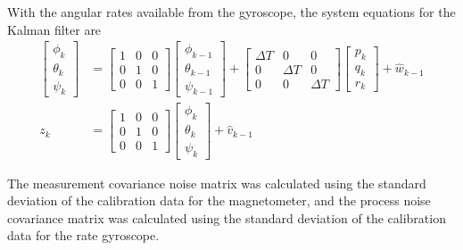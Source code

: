 With the angular rates available from the gyroscope, the system equations for the Kalman filter are
\begin{align}
\begin{bmatrix}
\phi_{k}\\
\theta_{k}\\
\psi_{k}
\end{bmatrix} & = \begin{bmatrix}
1 & 0 & 0\\0 & 1 & 0\\0 & 0 & 1
\end{bmatrix}\begin{bmatrix}
\phi_{k-1}\\
\theta_{k-1}\\
\psi_{k-1}
\end{bmatrix}
+ \begin{bmatrix}
\Delta T & 0 & 0 \\ 0 & \Delta T & 0\\0 & 0 & \Delta T
\end{bmatrix}\begin{bmatrix} 
p_k \\ q_k \\ r_k 
\end{bmatrix}+\hat{w}_{k-1}\\
z_k & = \begin{bmatrix}
1 & 0 &0\\0&1&0\\0&0&1
\end{bmatrix}\begin{bmatrix}
\phi_{k}\\
\theta_{k}\\
\psi_{k}
\end{bmatrix}+\hat{v}_{k-1}
\end{align}

The measurement covariance noise matrix was calculated using the standard deviation of the calibration data for the magnetometer, and the process noise covariance matrix was calculated using the standard deviation of the calibration data for the rate gyroscope.

